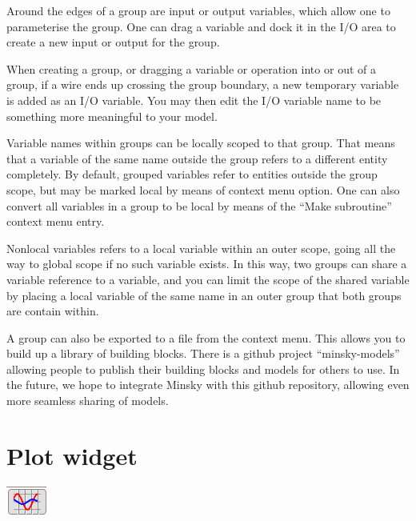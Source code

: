 Around the edges of a group are input or output variables, which allow
one to parameterise the group. One can drag a variable and dock it
in the I/O area to create a new input or output for the group.

When creating a group, or dragging a variable or operation into or
out of a group, if a wire ends up crossing the group boundary, a new
temporary variable is added as an I/O variable. You may then edit
the I/O variable name to be something more meaningful to your model.

Variable names within groups can be locally scoped to that group.
That means that a variable of the same name outside the group refers
to a different entity completely. By default, grouped variables refer
to entities outside the group scope, but may be marked local by means
of context menu option. One can also convert all variables in a group
to be local by means of the ``Make subroutine'' context menu entry.

Nonlocal variables refers to a local variable within an outer scope,
going all the way to global scope if no such variable exists. In this
way, two groups can share a variable reference to a variable, and
you can limit the scope of the shared variable by placing a local
variable of the same name in an outer group that both groups are contain
within.

A group can also be exported to a file from the context menu. This
allows you to build up a library of building blocks. There is a github
project ``minsky-models'' allowing people to publish their building
blocks and models for others to use. In the future, we hope to integrate
Minsky with this github repository, allowing even more seamless sharing
of models.

\section{Plot widget}

\label{PlotWidget}

\includegraphics{images/plotWidget}


